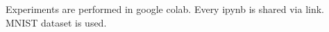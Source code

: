 Experiments are performed in google colab. Every ipynb is shared via link. MNIST\cite{deng2012mnist} dataset is used.